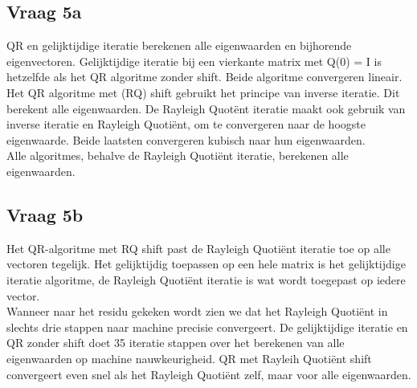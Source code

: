 \subsection*{Vraag 5a}
QR en gelijktijdige iteratie berekenen alle eigenwaarden en bijhorende eigenvectoren. Gelijktijdige iteratie bij een vierkante matrix met Q(0) = I is hetzelfde als het QR algoritme zonder shift. Beide algoritme convergeren lineair.\\ [12pt]

Het QR algoritme met (RQ) shift gebruikt het principe van inverse iteratie. Dit berekent alle eigenwaarden. De Rayleigh Quot\"ent iteratie maakt ook gebruik van inverse iteratie en Rayleigh Quoti\"ent, om te convergeren naar de hoogste eigenwaarde. Beide laatsten convergeren kubisch naar hun eigenwaarden.\\ [12pt]

Alle algoritmes, behalve de Rayleigh Quoti\"ent iteratie, berekenen alle eigenwaarden.\\ [12pt]

\subsection*{Vraag 5b}
Het QR-algoritme met RQ shift past de Rayleigh Quoti\"ent iteratie toe op alle vectoren tegelijk. Het gelijktijdig toepassen op een hele matrix is het gelijktijdige iteratie algoritme, de Rayleigh Quoti\"ent iteratie is wat wordt toegepast op iedere vector.\\[12pt]

Wanneer naar het residu gekeken wordt zien we dat het Rayleigh Quoti\"ent in slechts drie stappen naar machine precisie convergeert. De gelijktijdige iteratie en QR zonder shift doet 35 iteratie stappen over het berekenen van alle eigenwaarden op machine nauwkeurigheid. QR met Rayleih Quoti\"ent shift convergeert even snel als het Rayleigh Quoti\"ent zelf, maar voor alle eigenwaarden.\\[12 pt]


